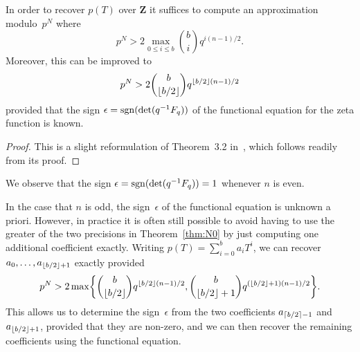 \begin{thm} \label{thm:N0}
In order to recover $p(T)$ over $\mathbf{Z}$ it suffices to compute 
an approximation modulo~$p^N$ where 
\begin{equation*}
p^N > 2 \max_{0 \leq i \leq b} \binom{b}{i} q^{i (n-1) / 2}.
\end{equation*}
Moreover, this can be improved to 
\begin{equation*}
p^N > 2 \binom{b}{\left\lfloor b/2\right\rfloor} q^{\left\lfloor b/2\right\rfloor (n-1) / 2}
\end{equation*}
provided that the sign $\epsilon = \operatorname{sgn}(\det(q^{-1} F_q))$ of the 
functional equation for the zeta function is known.
\end{thm}

\begin{proof}
This is a slight reformulation of {Theorem~3.2} in~\citep{Gerkmann2007}, 
which follows readily from its proof.
\end{proof}

\begin{rem}
We observe that the sign $\epsilon = \operatorname{sgn}(\det(q^{-1} F_q)) = 1$ 
whenever $n$ is even.
\end{rem}

\begin{rem}
In the case that $n$ is odd, the sign~$\epsilon$ of the functional 
equation is unknown a priori.  However, in practice it is often still 
possible to avoid having to use the greater of the two precisions in 
Theorem~\ref{thm:N0} by just computing one additional coefficient 
exactly.  Writing $p(T) = \sum_{i=0}^{b} a_i T^i$, we can recover 
$a_0, \dotsc, a_{\left\lfloor b/2\right\rfloor+1}$ exactly provided 
\begin{equation*}
p^N > 2 \max\biggl\{\binom{b}{\left\lfloor b/2\right\rfloor} q^{\left\lfloor b/2\right\rfloor (n-1) / 2}, 
                   \binom{b}{\left\lfloor b/2\right\rfloor+1} q^{(\left\lfloor b/2\right\rfloor+1) (n-1)/2} \biggr\}.
\end{equation*}
This allows us to determine the sign~$\epsilon$ from the two 
coefficients $a_{\left\lceil b/2\right\rceil-1}$ and $a_{\left\lfloor b/2\right\rfloor+1}$, provided 
that they are non-zero, and we can then recover the remaining 
coefficients using the functional equation.
\end{rem}


